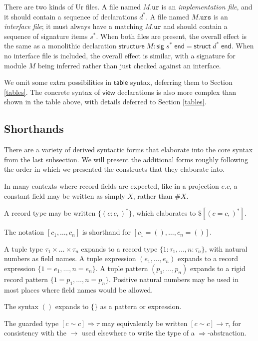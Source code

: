 \documentclass{article}
\newcommand{\mt}[1]{\mathsf{#1}}
\begin{document}
There are two kinds of Ur files.  A file named $M\texttt{.ur}$ is an \emph{implementation file}, and it should contain a sequence of declarations $d^*$.  A file named $M\texttt{.urs}$ is an \emph{interface file}; it must always have a matching $M\texttt{.ur}$ and should contain a sequence of signature items $s^*$.  When both files are present, the overall effect is the same as a monolithic declaration $\mt{structure} \; M : \mt{sig} \; s^* \; \mt{end} = \mt{struct} \; d^* \; \mt{end}$.  When no interface file is included, the overall effect is similar, with a signature for module $M$ being inferred rather than just checked against an interface.

We omit some extra possibilities in $\mt{table}$ syntax, deferring them to Section \ref{tables}.  The concrete syntax of $\mt{view}$ declarations is also more complex than shown in the table above, with details deferred to Section \ref{tables}.

\subsection{Shorthands}

There are a variety of derived syntactic forms that elaborate into the core syntax from the last subsection.  We will present the additional forms roughly following the order in which we presented the constructs that they elaborate into.

In many contexts where record fields are expected, like in a projection $e.c$, a constant field may be written as simply $X$, rather than $\#X$.

A record type may be written $\{(c : c,)^*\}$, which elaborates to $\$[(c = c,)^*]$.

The notation $[c_1, \ldots, c_n]$ is shorthand for $[c_1 = (), \ldots, c_n = ()]$.

A tuple type $\tau_1 \times \ldots \times \tau_n$ expands to a record type $\{1 : \tau_1, \ldots, n : \tau_n\}$, with natural numbers as field names.  A tuple expression $(e_1, \ldots, e_n)$ expands to a record expression $\{1 = e_1, \ldots, n = e_n\}$.  A tuple pattern $(p_1, \ldots, p_n)$ expands to a rigid record pattern $\{1 = p_1, \ldots, n = p_n\}$.  Positive natural numbers may be used in most places where field names would be allowed.

The syntax $()$ expands to $\{\}$ as a pattern or expression.

The guarded type $[c \sim c] \Rightarrow \tau$ may equivalently be written $[c \sim c] \to \tau$, for consistency with the $\to$ used elsewhere to write the type of a $\Rightarrow$-abstraction.
\end{document}
